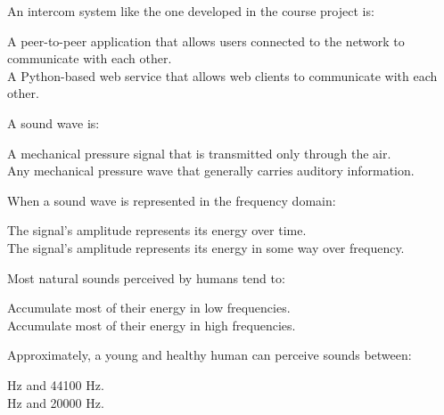 \documentclass[legalpaper, 12pt, addpoints]{exam}
\begin{document}
\begin{questions}

\question An intercom system like the one developed in the course project is:

\begin{oneparchoices}
  \choice A peer-to-peer application that allows users connected to the network to communicate with each other.\\
  \choice A Python-based web service that allows web clients to communicate with each other.
\end{oneparchoices}
  
\vspace{0.10in}

\question A sound wave is:

\begin{oneparchoices}
  \choice A mechanical pressure signal that is transmitted only through the air.\\
  \choice Any mechanical pressure wave that generally carries auditory information.
\end{oneparchoices}
  
\question When a sound wave is represented in the frequency domain:

\begin{oneparchoices}
  \choice The signal's amplitude represents its energy over time.\\
  \choice The signal's amplitude represents its energy in some way over frequency.
\end{oneparchoices}
  
\vspace{0.10in}

\question Most natural sounds perceived by humans tend to:

\begin{oneparchoices}
  \choice Accumulate most of their energy in low frequencies.\\
  \choice Accumulate most of their energy in high frequencies.
\end{oneparchoices}
  
\vspace{0.10in}

\question Approximately, a young and healthy human can perceive sounds between:

\begin{oneparchoices}
   Hz and 44100 Hz.\\
   Hz and 20000 Hz.
\end{oneparchoices}
  

\end{questions}
\end{document}
